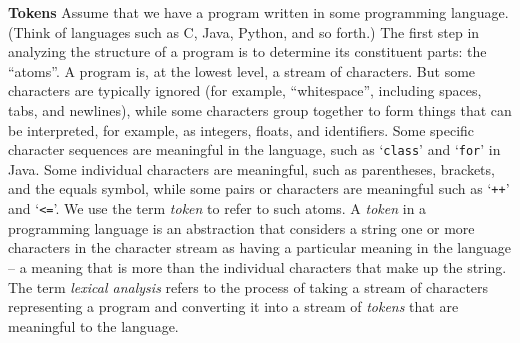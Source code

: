 \begin{minipage}[t]{\sw}
\slidenumber
\LARGE
{\bf Tokens}\exx
Assume that we have a program written in some programming language.
(Think of languages such as C, Java, Python, and so forth.)
The first step in analyzing the structure of a program
is to determine its constituent parts: the ``atoms''.\exx
A program is, at the lowest level, a stream of characters.
But some characters are typically ignored
(for example, ``whitespace'', including spaces, tabs, and newlines),
while some characters group together to form things
that can be interpreted, for example, as integers, floats, and identifiers.
Some specific character sequences are meaningful in the language,
such as `\verb'class'' and `\verb'for'' in Java.
Some individual characters are meaningful,
such as parentheses, brackets, and the equals symbol,
while some pairs or characters are meaningful
such as `\verb'++'' and `\verb'<=''.
We use the term {\em token} to refer to such atoms.\exx
A {\em token} in a programming language is an abstraction
that considers a string one or more characters in the character stream
as having a particular meaning in the language --
a meaning that is more than the individual characters
that make up the string.
The term {\em lexical analysis} refers
to the process of taking a stream of characters representing a program
and converting it into a stream of {\em tokens}
that are meaningful to the language.

\end{minipage}

